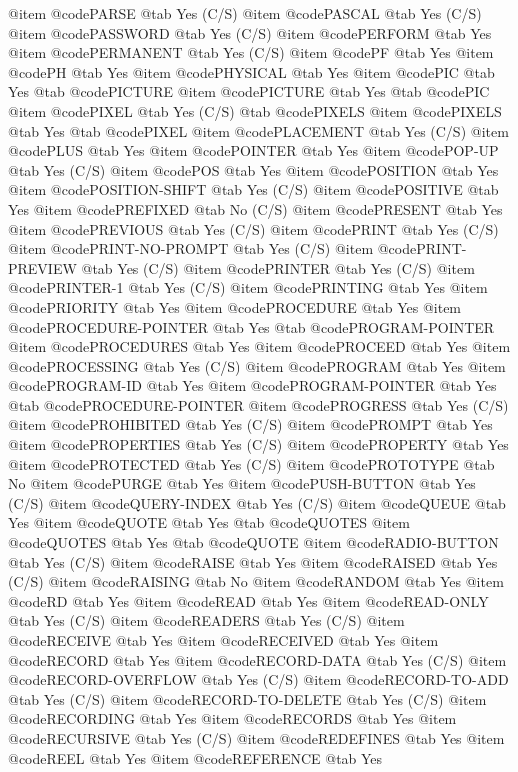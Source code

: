 @item @code{PARSE} @tab Yes (C/S)
@item @code{PASCAL} @tab Yes (C/S)
@item @code{PASSWORD} @tab Yes (C/S)
@item @code{PERFORM} @tab Yes
@item @code{PERMANENT} @tab Yes (C/S)
@item @code{PF} @tab Yes
@item @code{PH} @tab Yes
@item @code{PHYSICAL} @tab Yes
@item @code{PIC} @tab Yes @tab @code{PICTURE}
@item @code{PICTURE} @tab Yes @tab @code{PIC}
@item @code{PIXEL} @tab Yes (C/S) @tab @code{PIXELS}
@item @code{PIXELS} @tab Yes @tab @code{PIXEL}
@item @code{PLACEMENT} @tab Yes (C/S)
@item @code{PLUS} @tab Yes
@item @code{POINTER} @tab Yes
@item @code{POP-UP} @tab Yes (C/S)
@item @code{POS} @tab Yes
@item @code{POSITION} @tab Yes
@item @code{POSITION-SHIFT} @tab Yes (C/S)
@item @code{POSITIVE} @tab Yes
@item @code{PREFIXED} @tab No (C/S)
@item @code{PRESENT} @tab Yes
@item @code{PREVIOUS} @tab Yes (C/S)
@item @code{PRINT} @tab Yes (C/S)
@item @code{PRINT-NO-PROMPT} @tab Yes (C/S)
@item @code{PRINT-PREVIEW} @tab Yes (C/S)
@item @code{PRINTER} @tab Yes (C/S)
@item @code{PRINTER-1} @tab Yes (C/S)
@item @code{PRINTING} @tab Yes
@item @code{PRIORITY} @tab Yes
@item @code{PROCEDURE} @tab Yes
@item @code{PROCEDURE-POINTER} @tab Yes @tab @code{PROGRAM-POINTER}
@item @code{PROCEDURES} @tab Yes
@item @code{PROCEED} @tab Yes
@item @code{PROCESSING} @tab Yes (C/S)
@item @code{PROGRAM} @tab Yes
@item @code{PROGRAM-ID} @tab Yes
@item @code{PROGRAM-POINTER} @tab Yes @tab @code{PROCEDURE-POINTER}
@item @code{PROGRESS} @tab Yes (C/S)
@item @code{PROHIBITED} @tab Yes (C/S)
@item @code{PROMPT} @tab Yes
@item @code{PROPERTIES} @tab Yes (C/S)
@item @code{PROPERTY} @tab Yes
@item @code{PROTECTED} @tab Yes (C/S)
@item @code{PROTOTYPE} @tab No
@item @code{PURGE} @tab Yes
@item @code{PUSH-BUTTON} @tab Yes (C/S)
@item @code{QUERY-INDEX} @tab Yes (C/S)
@item @code{QUEUE} @tab Yes
@item @code{QUOTE} @tab Yes @tab @code{QUOTES}
@item @code{QUOTES} @tab Yes @tab @code{QUOTE}
@item @code{RADIO-BUTTON} @tab Yes (C/S)
@item @code{RAISE} @tab Yes
@item @code{RAISED} @tab Yes (C/S)
@item @code{RAISING} @tab No
@item @code{RANDOM} @tab Yes
@item @code{RD} @tab Yes
@item @code{READ} @tab Yes
@item @code{READ-ONLY} @tab Yes (C/S)
@item @code{READERS} @tab Yes (C/S)
@item @code{RECEIVE} @tab Yes
@item @code{RECEIVED} @tab Yes
@item @code{RECORD} @tab Yes
@item @code{RECORD-DATA} @tab Yes (C/S)
@item @code{RECORD-OVERFLOW} @tab Yes (C/S)
@item @code{RECORD-TO-ADD} @tab Yes (C/S)
@item @code{RECORD-TO-DELETE} @tab Yes (C/S)
@item @code{RECORDING} @tab Yes
@item @code{RECORDS} @tab Yes
@item @code{RECURSIVE} @tab Yes (C/S)
@item @code{REDEFINES} @tab Yes
@item @code{REEL} @tab Yes
@item @code{REFERENCE} @tab Yes
